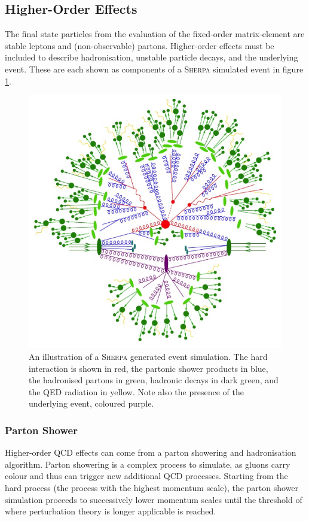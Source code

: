 \subsection{Higher-Order Effects}
The final state particles from the evaluation of the fixed-order matrix-element are stable leptons and (non-observable) partons. Higher-order effects must be included to describe hadronisation, unstable particle decays, and the underlying event. These are each shown as components of a \textsc{Sherpa} simulated event in figure \ref{sherpa_event_sim}.
\begin{figure}
\centering
\includegraphics[scale=0.4]{images/sherpa_event_sim.png}
\caption{An illustration of a \textsc{Sherpa} generated event simulation. The hard interaction is shown in red, the partonic shower products in blue, the hadronised partons in green, hadronic decays in dark green, and the QED radiation in yellow. Note also the presence of the underlying event, coloured purple. \cite{SHERPA_image}}
\label{sherpa_event_sim}
\end{figure}
\subsubsection{Parton Shower}
Higher-order QCD effects can come from a parton showering and hadronisation algorithm. Parton showering is a complex process to simulate, as gluons carry colour and thus can trigger new additional QCD processes. Starting from the hard process (the process with the highest momentum scale), the parton shower simulation proceeds to successively lower momentum scales until the threshold of where perturbation theory is longer applicable is reached.
